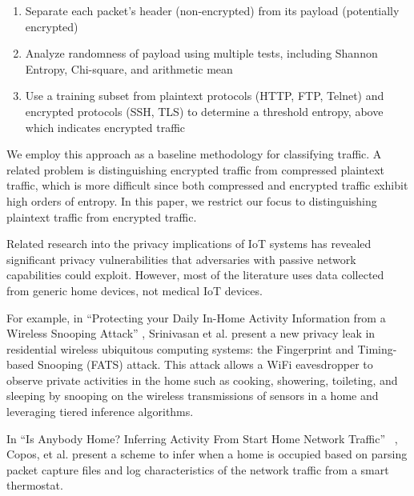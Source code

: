 \begin{enumerate}
  \item Separate each packet's header (non-encrypted) from its payload (potentially encrypted)
  \item Analyze randomness of payload using multiple tests, including Shannon Entropy, Chi-square, and arithmetic mean
  \item Use a training subset from plaintext protocols (HTTP, FTP, Telnet) and encrypted protocols (SSH, TLS) to determine a threshold entropy, above which indicates encrypted traffic
\end{enumerate}

We employ this approach as a baseline methodology for classifying traffic. A related problem is distinguishing encrypted traffic from compressed plaintext traffic, which is more difficult since both compressed and encrypted traffic exhibit high orders of entropy. In this paper, we restrict our focus to distinguishing plaintext traffic from encrypted traffic.  

Related research into the privacy implications of IoT systems has revealed significant privacy vulnerabilities that adversaries with passive network capabilities could exploit. However, most of the literature uses data collected from generic home devices, not medical IoT devices.



For example, in ``Protecting your Daily In-Home Activity Information from a Wireless Snooping Attack'' \cite{srinivasan2008fats}, Srinivasan et al. present a new privacy leak in residential wireless ubiquitous computing systems: the Fingerprint and Timing-based Snooping (FATS) attack. This attack allows a WiFi eavesdropper to observe private activities in the home such as cooking, showering, toileting, and sleeping by snooping on the wireless transmissions of sensors in a home and leveraging tiered inference algorithms.

In ``Is Anybody Home? Inferring Activity From Start Home Network Traffic'' ~\cite{coposIoT}, Copos, et al. present a scheme to infer when a home is occupied based on parsing packet capture files and log characteristics of the network traffic from a smart thermostat. 

